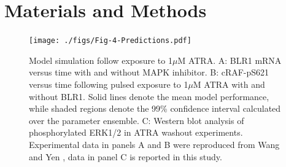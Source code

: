 \documentclass[10pt,twocolumn,twoside,final]{IEEEtran}
\begin{document}
\section{Materials and Methods}

\begin{figure}[!t]\centering
\texttt{[image: ./figs/Fig-4-Predictions.pdf]}
\caption{Model simulation follow exposure to 1$\mu$M ATRA.
A: BLR1 mRNA versus time with and without MAPK inhibitor.
B: cRAF-pS621 versus time following pulsed exposure to 1$\mu$M ATRA with and without BLR1.
Solid lines denote the mean model performance, while shaded regions denote the 99\% confidence interval calculated over the parameter ensemble.
C: Western blot analysis of phosphorylated ERK1/2 in ATRA washout experiments.
Experimental data in panels A and B were reproduced from Wang and Yen \cite{Wang2008}, data in panel C is reported in this study. }\label{fig:model-predictions}
\end{figure}
\end{document}
